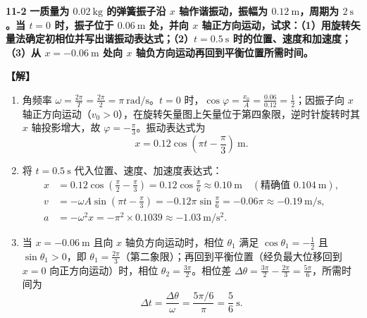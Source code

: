 \documentclass[zihao=5,a4paper,UTF8]{ctexart}
\newenvironment{prob}[2]{%
    \par\vspace{6pt}\noindent\textbf{\color{navy}#1} \textbf{#2}\par\nopagebreak\vspace{2pt}%
}{%
    \par\vspace{4pt}%
}
\newcommand{\sol}{\noindent\textbf{\color{tealaccent}【解】}\ }
\begin{document}
\begin{prob}{11-2}{一质量为 $0.02\ \mathrm{kg}$ 的弹簧振子沿 $x$ 轴作谐振动，振幅为 $0.12\ \mathrm{m}$，周期为 $2\ \mathrm{s}$。当 $t=0$ 时，振子位于 $0.06\ \mathrm{m}$ 处，并向 $x$ 轴正方向运动，试求：（1）用旋转矢量法确定初相位并写出谐振动表达式；（2）$t=0.5\ \mathrm{s}$ 时的位置、速度和加速度；（3）从 $x=-0.06\ \mathrm{m}$ 处向 $x$ 轴负方向运动再回到平衡位置所需时间。}
\sol
\begin{enumerate}[leftmargin=2em, itemsep=2pt]
    \item 角频率 $\omega = \frac{2\pi}{T} = \frac{2\pi}{2} = \pi\ \mathrm{rad/s}$。$t=0$ 时，$\cos\varphi = \frac{x_0}{A} = \frac{0.06}{0.12} = \frac{1}{2}$；因振子向 $x$ 轴正方向运动（$v_0 > 0$），在旋转矢量图上矢量位于第四象限，逆时针旋转时其 $x$ 轴投影增大，故 $\varphi = -\frac{\pi}{3}$。振动表达式为
    \[
        x = 0.12\cos\left(\pi t - \frac{\pi}{3}\right)\ \mathrm{m}.
    \]
    \item 将 $t = 0.5\ \mathrm{s}$ 代入位置、速度、加速度表达式：
    \begin{align*}
        x &= 0.12\cos\left(\frac{\pi}{2} - \frac{\pi}{3}\right) = 0.12\cos\frac{\pi}{6} \approx 0.10\ \mathrm{m}\quad (\text{精确值 } 0.104\ \mathrm{m}),\\
        v &= -\omega A\sin\left(\pi t - \frac{\pi}{3}\right) = -0.12\pi\sin\frac{\pi}{6} = -0.06\pi \approx -0.19\ \mathrm{m/s},\\
        a &= -\omega^2 x = -\pi^2 \times 0.1039 \approx -1.03\ \mathrm{m/s^2}.
    \end{align*}
    \item 当 $x = -0.06\ \mathrm{m}$ 且向 $x$ 轴负方向运动时，相位 $\theta_1$ 满足 $\cos\theta_1 = -\frac{1}{2}$ 且 $\sin\theta_1 > 0$，即 $\theta_1 = \frac{2\pi}{3}$（第二象限）；再回到平衡位置（经负最大位移回到 $x=0$ 向正方向运动）时，相位 $\theta_2 = \frac{3\pi}{2}$。相位差 $\Delta\theta = \frac{3\pi}{2} - \frac{2\pi}{3} = \frac{5\pi}{6}$，所需时间为
    \[
        \Delta t = \frac{\Delta\theta}{\omega} = \frac{5\pi/6}{\pi} = \frac{5}{6}\ \mathrm{s}.
    \]
\end{enumerate}
\end{prob}
\end{document}
